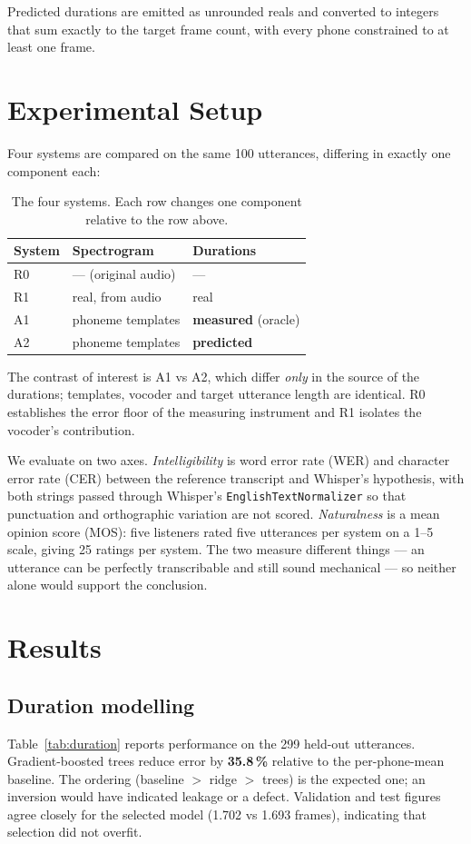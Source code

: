 \documentclass[conference]{IEEEtran}
\begin{document}
Predicted durations are emitted as unrounded reals and converted to integers that sum exactly to
the target frame count, with every phone constrained to at least one frame.

\section{Experimental Setup}

Four systems are compared on the same 100 utterances, differing in exactly one component each:

\begin{table}[t]
\caption{The four systems. Each row changes one component relative to the row above.}
\label{tab:systems}
\centering
\begin{tabular}{llp{3.5cm}}
\toprule
\textbf{System} & \textbf{Spectrogram} & \textbf{Durations} \\
\midrule
R0 & --- (original audio) & --- \\
R1 & real, from audio & real \\
A1 & phoneme templates & \textbf{measured} (oracle) \\
A2 & phoneme templates & \textbf{predicted} \\
\bottomrule
\end{tabular}
\end{table}

The contrast of interest is A1 vs A2, which differ \emph{only} in the source of the durations;
templates, vocoder and target utterance length are identical. R0 establishes the error floor of
the measuring instrument and R1 isolates the vocoder's contribution.

We evaluate on two axes. \emph{Intelligibility} is word error rate (WER) and character error rate
(CER) between the reference transcript and Whisper's hypothesis, with both strings passed through
Whisper's \texttt{EnglishTextNormalizer} so that punctuation and orthographic variation are not
scored. \emph{Naturalness} is a mean opinion score (MOS): five listeners rated five utterances
per system on a 1--5 scale, giving 25 ratings per system. The two measure different things --- an
utterance can be perfectly transcribable and still sound mechanical --- so neither alone would
support the conclusion.

\section{Results}

\subsection{Duration modelling}
Table~\ref{tab:duration} reports performance on the 299 held-out utterances. Gradient-boosted
trees reduce error by \textbf{35.8\,\%} relative to the per-phone-mean baseline. The ordering
(baseline $>$ ridge $>$ trees) is the expected one; an inversion would have indicated leakage or a
defect. Validation and test figures agree closely for the selected model (1.702 vs 1.693 frames),
indicating that selection did not overfit.
\end{document}
